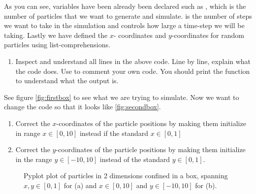 \documentclass{article}
\begin{document}
As you can see, variables have been already been declared such as , which is the number of particles that we want to generate and simulate.
 is the number of steps we want to take in the simulation and  controls how large a time-step we will be taking.
Lastly we have defined the $x$- coordinates and $y$-coordinates for  random particles using list-comprehensions.

\begin{enumerate}
  \item Inspect and understand all lines in the above code.
        Line by line, explain what the code does. Use \code{\#} to comment your own code.
        You should print the  function to understand what the output is.
\end{enumerate}

See figure \ref{fig:firstbox} to see what we are trying to simulate.
Now we want to change the code so that it looks like \ref{fig:secondbox}.

\begin{enumerate}
    \item Correct the $x$-coordinates of the particle positions by making them initialize in range $x \in [0, 10]$ instead if the standard $x \in [0,1]$
    \item Correct the $y$-coordinates of the particle positions by making them initialize in the range $y \in [-10,10]$ instead of the standard $y \in [0,1]$.
\end{enumerate}


\begin{figure}[htb]
  \centering
  \caption{
    Pyplot plot of particles in 2 dimensions confined in a box, spanning $x, y \in [0,1]$ for (a) and $x \in [0,10]$ and $y \in [-10,10]$ for (b).
  }
\end{figure}
\end{document}
